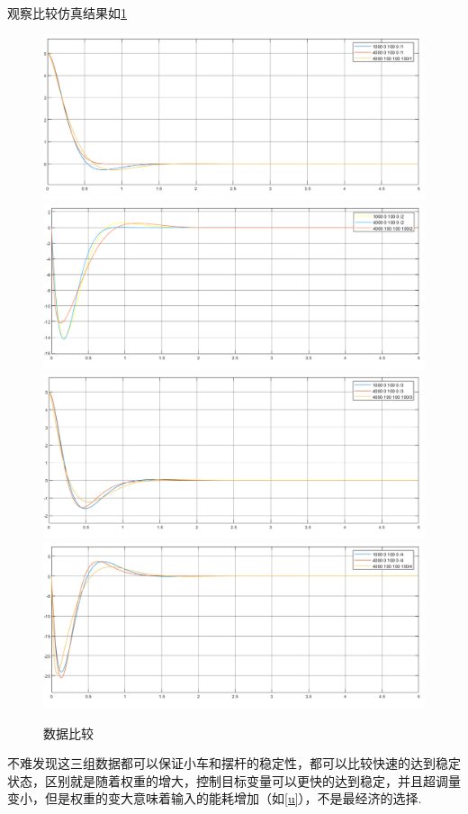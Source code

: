 观察比较仿真结果如\ref{data}
\begin{figure}[hbpt]
\centering
\includegraphics[width=12cm]{x.png}
\includegraphics[width=12cm]{dotx.png}
\includegraphics[width=12cm]{fai.png}
\includegraphics[width=12cm]{dotfai.png}
\caption{数据比较}\label{data}
\end{figure}

不难发现这三组数据都可以保证小车和摆杆的稳定性，都可以比较快速的达到稳定状态，区别就是随着权重的增大，控制目标变量可以更快的达到稳定，并且超调量变小，但是权重的变大意味着输入的能耗增加（如\ref{u}），不是最经济的选择.

